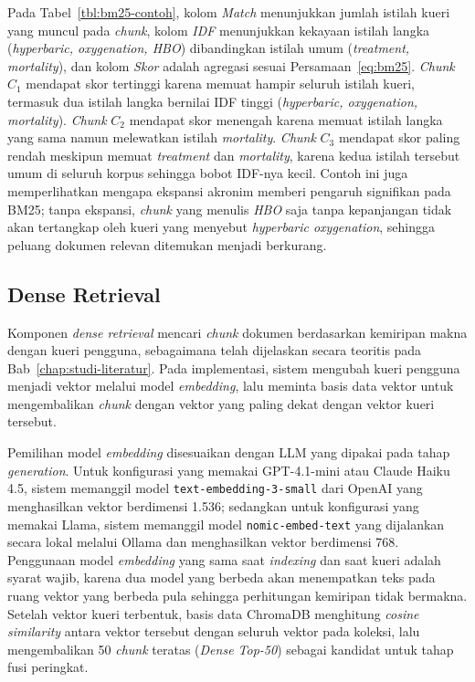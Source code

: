 Pada Tabel~\ref{tbl:bm25-contoh}, kolom \textit{Match} menunjukkan jumlah istilah kueri yang muncul pada \textit{chunk}, kolom \textit{IDF} menunjukkan kekayaan istilah langka (\textit{hyperbaric, oxygenation, HBO}) dibandingkan istilah umum (\textit{treatment, mortality}), dan kolom \textit{Skor} adalah agregasi sesuai Persamaan~\ref{eq:bm25}. \textit{Chunk} $C_1$ mendapat skor tertinggi karena memuat hampir seluruh istilah kueri, termasuk dua istilah langka bernilai IDF tinggi (\textit{hyperbaric, oxygenation, mortality}). \textit{Chunk} $C_2$ mendapat skor menengah karena memuat istilah langka yang sama namun melewatkan istilah \textit{mortality}. \textit{Chunk} $C_3$ mendapat skor paling rendah meskipun memuat \textit{treatment} dan \textit{mortality}, karena kedua istilah tersebut umum di seluruh korpus sehingga bobot IDF-nya kecil. Contoh ini juga memperlihatkan mengapa ekspansi akronim memberi pengaruh signifikan pada BM25; tanpa ekspansi, \textit{chunk} yang menulis \textit{HBO} saja tanpa kepanjangan tidak akan tertangkap oleh kueri yang menyebut \textit{hyperbaric oxygenation}, sehingga peluang dokumen relevan ditemukan menjadi berkurang.


\subsection{Dense Retrieval}
\label{subsec:impl-dense}

Komponen \textit{dense retrieval} mencari \textit{chunk} dokumen berdasarkan kemiripan makna dengan kueri pengguna, sebagaimana telah dijelaskan secara teoritis pada Bab~\ref{chap:studi-literatur}. Pada implementasi, sistem mengubah kueri pengguna menjadi vektor melalui model \textit{embedding}, lalu meminta basis data vektor untuk mengembalikan \textit{chunk} dengan vektor yang paling dekat dengan vektor kueri tersebut.

Pemilihan model \textit{embedding} disesuaikan dengan LLM yang dipakai pada tahap \textit{generation}. Untuk konfigurasi yang memakai GPT-4.1-mini atau Claude Haiku 4.5, sistem memanggil model \texttt{text-embedding-3-small} dari OpenAI yang menghasilkan vektor berdimensi 1.536; sedangkan untuk konfigurasi yang memakai Llama, sistem memanggil model \texttt{nomic-embed-text} yang dijalankan secara lokal melalui Ollama dan menghasilkan vektor berdimensi 768. Penggunaan model \textit{embedding} yang sama saat \textit{indexing} dan saat kueri adalah syarat wajib, karena dua model yang berbeda akan menempatkan teks pada ruang vektor yang berbeda pula sehingga perhitungan kemiripan tidak bermakna. Setelah vektor kueri terbentuk, basis data ChromaDB menghitung \textit{cosine similarity} antara vektor tersebut dengan seluruh vektor pada koleksi, lalu mengembalikan 50 \textit{chunk} teratas (\textit{Dense Top-50}) sebagai kandidat untuk tahap fusi peringkat.

